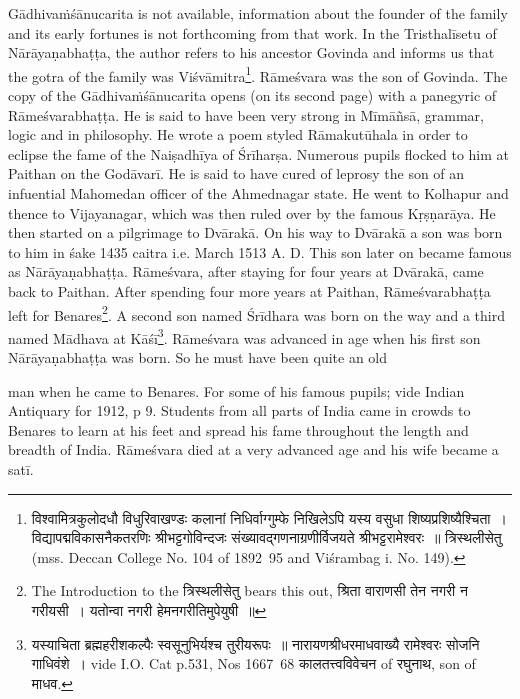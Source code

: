 \documentclass[11pt, openany]{book}
\begin{document}
\noindent
Gādhivaṁśānucarita is not available, information about the founder of the family and its early fortunes is not forthcoming from that work. In the Tristhalīsetu of Nārāyaṇabhaṭṭa, the author refers to his ancestor Govinda and informs us that the gotra of the family was Viśvāmitra\renewcommand{\thefootnote}{1}\footnote{विश्वामित्रकुलोदधौ विधुरिवाखण्डः कलानां निधिर्वाग्गुम्फे निखिलेऽपि यस्य वसुधा शिष्यप्रशिष्यैश्चिता~। विद्यापद्मविकासनैकतरणिः श्रीभट्टगोविन्दजः संख्यावद्गणनाग्रणीर्विजयते श्रीभट्टरामेश्वरः~॥ त्रिस्थलीसेतु (mss. Deccan College No. 104 of 1892\textendash\ 95 and Viśrambag i. No. 149).}. Rāmeśvara was the son of Govinda. The copy of the Gādhivaṁśānucarita opens (on its second page) with a panegyric of Rāmeśvarabhaṭṭa. He is said to have been very strong in Mīmāñsā, grammar, logic and in philosophy. He wrote a poem styled Rāmakutūhala in order to eclipse the fame of the Naiṣadhīya of Śrīharṣa. Numerous pupils flocked to him at Paithan on the Godāvarī. He is said to have cured of leprosy the son of an infuential Mahomedan officer of the Ahmednagar state. He went to Kolhapur and thence to Vijayanagar, which was then ruled over by the famous Kṛṣṇarāya. He then started on a pilgrimage to Dvārakā. On his way to Dvārakā a son was born to him in śake 1435 caitra i.e. March 1513 A. D. This son later on became famous as Nārāyaṇabhaṭṭa. Rāmeśvara, after staying for four years at Dvārakā, came back to Paithan. After spending four more years at Paithan, Rāmeśvarabhaṭṭa left for Benares\renewcommand{\thefootnote}{2}\footnote{The Introduction to the त्रिस्थलीसेतु bears this out, श्रिता वाराणसी तेन नगरी न गरीयसी~। यतोन्वा नगरी हेमनगरीतिमुपेयुषी~॥}. A second son named Śrīdhara was born on the way and a third named Mādhava at Kāśī\renewcommand{\thefootnote}{3}\footnote{यस्याचिता ब्रह्महरीशकल्पैः स्वसूनुभिर्यश्च तुरीयरूपः~॥ नारायणश्रीधरमाधवाख्यै रामेश्वरः सोजनि गाधिवंशे~। vide I.O. Cat p.531, Nos 1667\textendash\ 68 कालतत्त्वविवेचन of रघुनाथ, son of माधव.}. Rāmeśvara was advanced in age when his first son Nārāyaṇabhaṭṭa was born. So he must have been quite an old 

\newpage

\noindent
man when he came to Benares. For some of his famous pupils; vide Indian Antiquary for 1912, p 9. Students from all parts of India came in crowds to Benares to learn at his feet and spread his fame throughout the length and breadth of India. Rāmeśvara died at a very advanced age and his wife became a satī.
\end{document}
